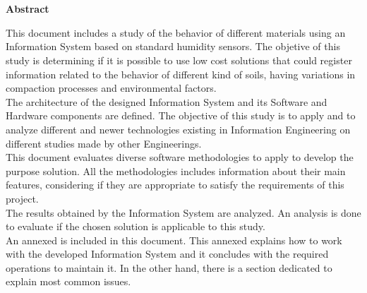 

\newpage


\chapter*{}
\begin{center}
\textbf{Abstract}
\end{center}

This document includes a study of the behavior of different materials using an Information System based on standard humidity sensors. The objetive of this study is determining if it is possible to use low cost solutions that could register information related to the behavior of different kind of soils, having variations in compaction processes and environmental factors.\\

The architecture of the designed Information System and its Software and Hardware components are defined. The objective of this study is to apply and to analyze different and newer technologies existing in Information Engineering on different studies made by other Engineerings.\\

This document evaluates diverse software methodologies to apply to develop the purpose solution. All the methodologies includes information about their main features, considering if they are appropriate to satisfy the requirements of this project.\\

The results obtained by the Information System are analyzed. An analysis is done to evaluate if the chosen solution is applicable to this study.\\

An annexed is included in this document. This annexed explains how to work with the developed Information System and it concludes with the required operations to maintain it. In the other hand, there is a section dedicated to explain most common issues.

